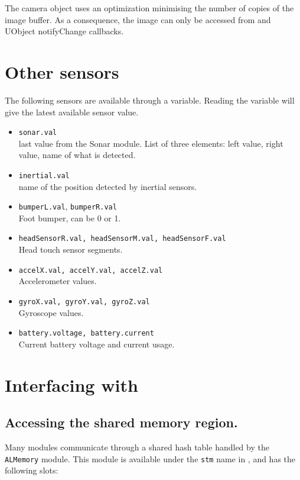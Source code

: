 The camera object uses an optimization minimising the number of copies of the
image buffer. As a consequence, the image can only be accessed from \us and
UObject notifyChange callbacks.

\section{Other sensors}

The following sensors are available through a \us variable.
Reading the variable will give the latest available sensor value.

\begin{itemize}
\item \lstinline|sonar.val| \\
    last value from the Sonar module. List of three elements: left value, right
    value, name of what is detected.
\item \lstinline|inertial.val| \\
    name of the position detected by inertial sensors.
\item \lstinline|bumperL.val|, \lstinline|bumperR.val| \\
    Foot bumper, can be 0 or 1.
\item \lstinline|headSensorR.val, headSensorM.val, headSensorF.val| \\
    Head touch sensor segments.
\item \lstinline|accelX.val, accelY.val, accelZ.val| \\
    Accelerometer values.
\item \lstinline|gyroX.val, gyroY.val, gyroZ.val| \\
    Gyroscope values.
\item \lstinline|battery.voltage, battery.current| \\
    Current battery voltage and current usage.
\end{itemize}

\section{Interfacing with \naoqi}

\subsection{Accessing the \naoqi shared memory region.}

Many \naoqi modules communicate through a shared hash table handled by the
\lstinline|ALMemory| module. This module is available under the \lstinline|stm|
name in \urbi, and has the following slots:

